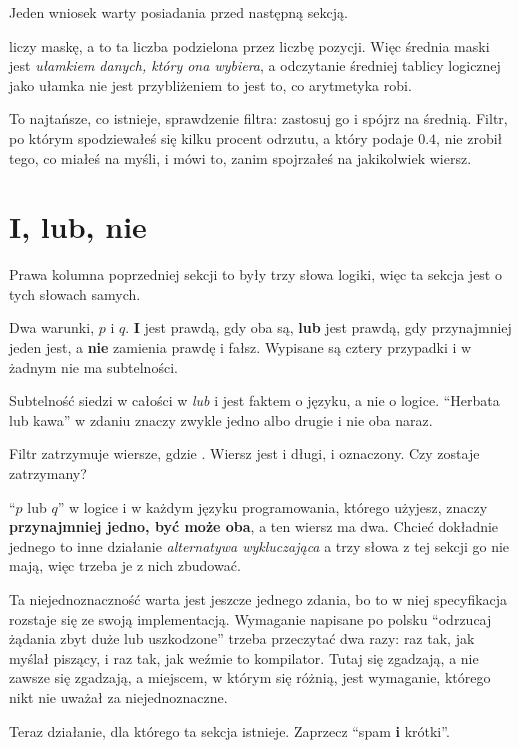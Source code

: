 \begin{fr}
Jeden wniosek warty posiadania przed następną sekcją.

 liczy maskę, a  to ta liczba podzielona przez
liczbę pozycji. Więc średnia maski jest \emph{ułamkiem danych, który ona
wybiera}, a odczytanie średniej tablicy logicznej jako ułamka nie jest
przybliżeniem \dash{} to jest to, co arytmetyka robi.

To najtańsze, co istnieje, sprawdzenie filtra: zastosuj go i spójrz na średnią.
Filtr, po którym spodziewałeś się kilku procent odrzutu, a który podaje
$\num{0.4}$, nie zrobił tego, co miałeś na myśli, i mówi to, zanim spojrzałeś
na jakikolwiek wiersz.
\end{fr}

\section{I, lub, nie}
\label{sec:F10-logic}

\begin{fr}
Prawa kolumna poprzedniej sekcji to były trzy słowa logiki, więc ta sekcja jest
o tych słowach samych.

Dwa warunki, $p$ i $q$. \textbf{I} jest prawdą, gdy oba są, \textbf{lub} jest
prawdą, gdy przynajmniej jeden jest, a \textbf{nie} zamienia prawdę i fałsz.
Wypisane są cztery przypadki i w żadnym nie ma subtelności.

Subtelność siedzi w całości w \emph{lub} i jest faktem o języku, a nie o
logice. \enquote{Herbata lub kawa} w zdaniu znaczy zwykle jedno albo drugie i
nie oba naraz.

Filtr zatrzymuje wiersze, gdzie . Wiersz jest i
długi, i oznaczony. Czy zostaje zatrzymany?
\nextframe
\end{fr}

\begin{fr}
\enquote{$p$ lub $q$} w logice i w każdym języku programowania, którego
użyjesz, znaczy \textbf{przynajmniej jedno, być może oba}, a ten wiersz ma
dwa. Chcieć dokładnie jednego to inne działanie \dash{} \emph{alternatywa
wykluczająca} \dash{} a trzy słowa z tej sekcji go nie mają, więc trzeba je z
nich zbudować.

Ta niejednoznaczność warta jest jeszcze jednego zdania, bo to w niej
specyfikacja rozstaje się ze swoją implementacją. Wymaganie napisane po polsku
\dash{} \enquote{odrzucaj żądania zbyt duże lub uszkodzone} \dash{} trzeba
przeczytać dwa razy: raz tak, jak myślał piszący, i raz tak, jak weźmie to
kompilator. Tutaj się zgadzają, a nie zawsze się zgadzają, a miejscem, w którym
się różnią, jest wymaganie, którego nikt nie uważał za niejednoznaczne.

Teraz działanie, dla którego ta sekcja istnieje. Zaprzecz
\enquote{spam \textbf{i} krótki}.
\dotline
\nextframe
\end{fr}

